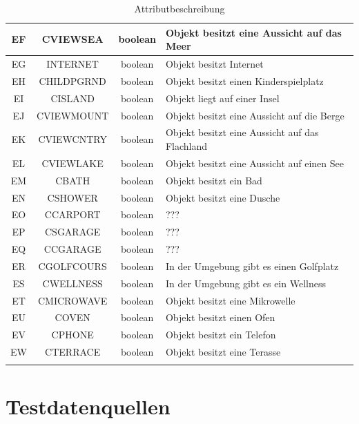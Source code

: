 \begin{longtable}{ | c | c | c | L{7.5cm} | }
	EF & CVIEWSEA & boolean & Objekt besitzt eine Aussicht auf das Meer \\ \hline 
	EG & INTERNET & boolean & Objekt besitzt Internet \\ \hline 
	EH & CHILDPGRND & boolean & Objekt besitzt einen Kinderspielplatz \\ \hline 
	EI & CISLAND & boolean & Objekt liegt auf einer Insel \\ \hline 
	EJ & CVIEWMOUNT & boolean & Objekt besitzt eine Aussicht auf die Berge \\ \hline 
	EK & CVIEWCNTRY & boolean & Objekt besitzt eine Aussicht auf das Flachland \\ \hline 
	EL & CVIEWLAKE & boolean & Objekt besitzt eine Aussicht auf einen See \\ \hline 
	EM & CBATH & boolean & Objekt besitzt ein Bad \\ \hline 
	EN & CSHOWER & boolean & Objekt besitzt eine Dusche \\ \hline 
	EO & CCARPORT & boolean & ??? \\ \hline 
	EP & CSGARAGE & boolean & ??? \\ \hline 
	EQ & CCGARAGE & boolean & ??? \\ \hline 
	ER & CGOLFCOURS & boolean & In der Umgebung gibt es einen Golfplatz \\ \hline 
	ES & CWELLNESS & boolean & In der Umgebung gibt es ein Wellness \\ \hline 
	ET & CMICROWAVE & boolean & Objekt besitzt eine Mikrowelle \\ \hline 
	EU & COVEN & boolean & Objekt besitzt einen Ofen \\ \hline 
	EV & CPHONE & boolean & Objekt besitzt ein Telefon \\ \hline 
	EW & CTERRACE & boolean & Objekt besitzt eine Terasse \\ \hline 
	\caption{Attributbeschreibung}
\end{longtable} 

\chapter{Testdatenquellen}
\label{app:testdatenquellen}



